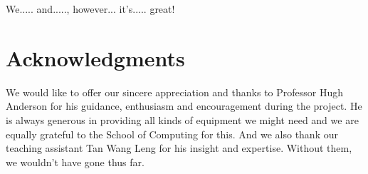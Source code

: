 \documentclass{acm_proc_article-sp}
\begin{document}
We..... and....., however... it's..... great!


\section{Acknowledgments}

We would like to offer our sincere appreciation and thanks to Professor Hugh Anderson for his guidance, enthusiasm and encouragement during the project. He is always generous in providing all kinds of equipment we might need and we are equally grateful to the School of Computing for this. And we also thank our teaching assistant Tan Wang Leng for his insight and expertise. Without them, we wouldn't have gone thus far.

%

%
%

\balancecolumns
\end{document}
